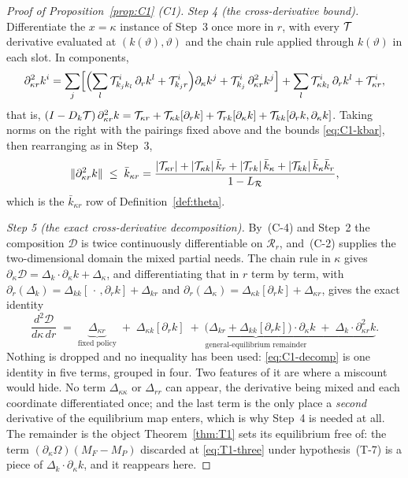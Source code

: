 \begin{proof}[Proof of Proposition~\ref{prop:C1} (C1)]
\emph{Step 4 (the cross-derivative bound).} Differentiate the $x = \kappa$ instance of Step~3 once
more in $r$, with every $\mathcal{T}$ derivative evaluated at $(k(\vartheta),\vartheta)$ and the chain
rule applied through $k(\vartheta)$ in each slot. In components,
\[
\partial^2_{\kappa r}k^i
= \sum_j\Bigl[\Bigl(\sum_l\mathcal{T}^i_{k_jk_l}\,\partial_r k^l + \mathcal{T}^i_{k_jr}\Bigr)\partial_\kappa k^j
+ \mathcal{T}^i_{k_j}\,\partial^2_{\kappa r}k^j\Bigr]
+ \sum_l\mathcal{T}^i_{\kappa k_l}\,\partial_r k^l + \mathcal{T}^i_{\kappa r},
\]
that is,
$(I-D_k\mathcal{T})\,\partial^2_{\kappa r}k = \mathcal{T}_{\kappa r} + \mathcal{T}_{\kappa k}[\partial_r k]
+ \mathcal{T}_{rk}[\partial_\kappa k] + \mathcal{T}_{kk}[\partial_r k,\partial_\kappa k]$. Taking norms on the
right with the pairings fixed above and the bounds \eqref{eq:C1-kbar}, then rearranging as in
Step~3,
\begin{equation}
\label{eq:C1-kkr}
\lVert\partial^2_{\kappa r}k\rVert
\;\le\; \bar k_{\kappa r}
= \frac{\lvert\mathcal{T}_{\kappa r}\rvert + \lvert\mathcal{T}_{\kappa k}\rvert\,\bar k_r
+ \lvert\mathcal{T}_{rk}\rvert\,\bar k_\kappa + \lvert\mathcal{T}_{kk}\rvert\,\bar k_\kappa\bar k_r}
{1-L_{\mathcal R}},
\end{equation}
which is the $\bar k_{\kappa r}$ row of Definition~\ref{def:theta}.

\emph{Step 5 (the exact cross-derivative decomposition).} By~(C-4) and Step~2 the composition
$\mathcal D$ is twice continuously differentiable on $\mathcal R_r$, and~(C-2) supplies the
two-dimensional domain the mixed partial needs. The chain rule in $\kappa$ gives
$\partial_\kappa\mathcal D = \Delta_k\cdot\partial_\kappa k + \Delta_\kappa$, and differentiating
that in $r$ term by term, with
$\partial_r(\Delta_k) = \Delta_{kk}[\,\cdot\,,\partial_r k] + \Delta_{kr}$ and
$\partial_r(\Delta_\kappa) = \Delta_{\kappa k}[\partial_r k] + \Delta_{\kappa r}$, gives the exact
identity
\begin{equation}
\label{eq:C1-decomp}
\frac{d^2\mathcal D}{d\kappa\,dr}
\;=\; \underbrace{\Delta_{\kappa r}}_{\text{fixed policy}}
\;+\; \underbrace{\Delta_{\kappa k}[\partial_r k]
\;+\; \bigl(\Delta_{kr} + \Delta_{kk}[\partial_r k]\bigr)\cdot\partial_\kappa k
\;+\; \Delta_k\cdot\partial^2_{\kappa r}k}_{\text{general-equilibrium remainder}} .
\end{equation}
Nothing is dropped and no inequality has been used: \eqref{eq:C1-decomp} is one identity in five
terms, grouped in four. Two features of it are where a miscount would hide. No term
$\Delta_{\kappa\kappa}$ or $\Delta_{rr}$ can appear, the derivative being mixed and each coordinate
differentiated once; and the last term is the only place a \emph{second} derivative of the
equilibrium map enters, which is why Step~4 is needed at all. The remainder is the object
Theorem~\ref{thm:T1} sets its equilibrium free of: the term
$(\partial_\kappa\Omega)(M_F - M_P)$ discarded at \eqref{eq:T1-three} under hypothesis~(T-7) is a
piece of $\Delta_k\cdot\partial_\kappa k$, and it reappears here.


\end{proof}
